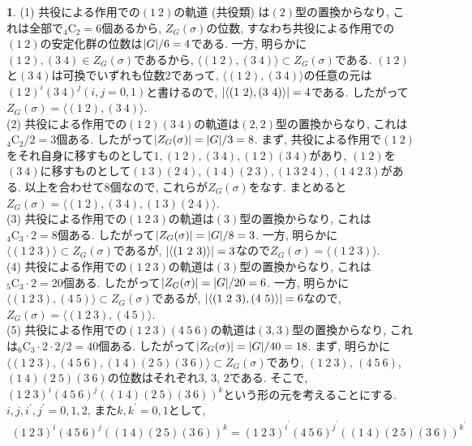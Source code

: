 \documentclass{amsart}
\theoremstyle{definition}
\newtheorem{ans}{}
\numberwithin{ans}{subsection}
\DeclarePairedDelimiter{\abs}{\lvert}{\rvert}
\begin{document}
\begin{ans}
  (1) 共役による作用での$(1\ 2)$の軌道 (共役類) は$(2)$型の置換からなり, これは全部で${}_4\mathrm{C}_2 = 6$個あるから,
  $Z_G(\sigma)$の位数, すなわち共役による作用での$(1\ 2)$の安定化群の位数は$\abs{G}/6 = 4$である.
  一方, 明らかに$(1\ 2), (3\ 4) \in Z_G(\sigma)$であるから,
  $\langle (1\ 2), (3\ 4) \rangle \subset Z_G(\sigma)$である.
  $(1\ 2)$と$(3\ 4)$は可換でいずれも位数$2$であって, $\langle (1\ 2), (3\ 4) \rangle$の任意の元は$(1\ 2)^i(3\ 4)^j (i, j = 0, 1)$と書けるので,
  $\abs{\langle (1\ 2), (3\ 4) \rangle} = 4$である.
  したがって$Z_G(\sigma) = \langle (1\ 2), (3\ 4) \rangle$.\\
  (2) 共役による作用での$(1\ 2)(3\ 4)$の軌道は$(2, 2)$型の置換からなり, これは${}_4\mathrm{C}_2/2 = 3$個ある.
  したがって$\abs{Z_G(\sigma)} = \abs{G}/3 = 8$.
  まず, 共役による作用で$(1\ 2)$をそれ自身に移すものとして$1, (1\ 2), (3\ 4), (1\ 2)(3\ 4)$があり,
  $(1\ 2)$を$(3\ 4)$に移すものとして$(1\ 3)(2\ 4), (1\ 4)(2\ 3), (1\ 3\ 2\ 4), (1\ 4\ 2\ 3)$がある.
  以上を合わせて$8$個なので, これらが$Z_G(\sigma)$をなす.
  まとめると$Z_G(\sigma) = \langle (1\ 2), (3\ 4), (1\ 3)(2\ 4) \rangle$.\\
  (3) 共役による作用での$(1\ 2\ 3)$の軌道は$(3)$型の置換からなり, これは${}_4\mathrm{C}_3 \cdot 2 = 8$個ある.
  したがって$\abs{Z_G(\sigma)} = \abs{G}/8 = 3$.
  一方, 明らかに$\langle (1\ 2\ 3) \rangle \subset Z_G(\sigma)$であるが,
  $\abs{\langle (1\ 2\ 3) \rangle} = 3$なので$Z_G(\sigma) = \langle (1\ 2\ 3) \rangle$.\\
  (4) 共役による作用での$(1\ 2\ 3)$の軌道は$(3)$型の置換からなり, これは${}_5\mathrm{C}_3 \cdot 2 = 20$個ある.
  したがって$\abs{Z_G(\sigma)} = \abs{G}/20 = 6$.
  一方, 明らかに$\langle (1\ 2\ 3), (4\ 5) \rangle \subset Z_G(\sigma)$であるが,
  $\abs{\langle (1\ 2\ 3), (4\ 5) \rangle} = 6$なので,
  $Z_G(\sigma) = \langle (1\ 2\ 3), (4\ 5) \rangle$.\\
  (5) 共役による作用での$(1\ 2\ 3)(4\ 5\ 6)$の軌道は$(3, 3)$型の置換からなり, これは${}_6\mathrm{C}_3 \cdot 2 \cdot 2 / 2 = 40$個ある.
  したがって$\abs{Z_G(\sigma)} = \abs{G}/40 = 18$.
  まず, 明らかに$\langle (1\ 2\ 3), (4\ 5\ 6), (1\ 4)(2\ 5)(3\ 6) \rangle \subset Z_G(\sigma)$であり,
  $(1\ 2\ 3)$, $(4\ 5\ 6)$, $(1\ 4)(2\ 5)(3\ 6)$の位数はそれぞれ$3$, $3$, $2$である.
  そこで, $(1\ 2\ 3)^i(4\ 5\ 6)^j((1\ 4)(2\ 5)(3\ 6))^k$という形の元を考えることにする.
  $i, j, i^\prime, j^\prime = 0, 1, 2$, また$k, k^\prime = 0, 1$として,
  \begin{align*}
    (1\ 2\ 3)^i(4\ 5\ 6)^j((1\ 4)(2\ 5)(3\ 6))^k = (1\ 2\ 3)^{i^\prime}(4\ 5\ 6)^{j^\prime}((1\ 4)(2\ 5)(3\ 6))^{k^\prime}

\end{align*}
\end{ans}
\end{document}
